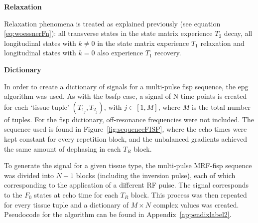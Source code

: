 \hfill

\textbf{Relaxation}

Relaxation phenomena is treated as explained previously (see equation \ref{eq:woessnerFn}):
all transverse states in the state matrix experience $T_2$ decay, all longitudinal states with $k \neq 0$ in the state matrix experience $T_1$ relaxation and longitudinal states with $k = 0$ also experience $T_1$ recovery.

\hfill

\large \textbf{Dictionary} \normalsize

In order to create a dictionary of signals for a multi-pulse \ac{fisp} sequence, the \ac{epg} algorithm was used.
As with the \ac{bssfp} case, a signal of N time points is created for each `tissue tuple'
$(T_{1_j}, T_{2_j})$, with $j \in [1, M]$, where $M$ is the total number of tuples.
For the \ac{fisp} dictionary, off-resonance frequencies were not included.
The sequence used is found in Figure~\ref{fig:sequenceFISP}, where the echo times were kept constant for every repetition block, and the unbalanced gradients achieved the same amount of dephasing in each $T_R$ block.

\hfill

To generate the signal for a given tissue type, the multi-pulse MRF-\ac{fisp} sequence was divided into $N+1$ blocks (including the inversion pulse), each of which corresponding to the application of a different RF pulse.
The signal corresponds to the $F_0$ states at echo time for each $T_R$ block.
This process was then repeated for every tissue tuple and a dictionary of $M \times N$ complex values was created.
Pseudocode for the algorithm can be found in Appendix~\ref{appendixlabel2}.

\hfill




